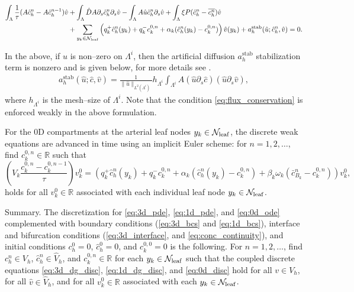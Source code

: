 \documentclass[fleqn,10pt]{wlscirep}
\begin{document}
\begin{align}\label{eq:1d_dg_disc}
\begin{split}
  \int_{\Lambda}  \frac{1}{\tau}(A  \hat c_h^n - A \hat c_h^{n-1}) \hat v  &+ \int_{\Lambda} \hat D A \partial_s \hat c_h^n  \partial_s \hat v - \int_{\Lambda} A \hat u \hat c_h^n \partial_s \hat v   +  \int_{\Lambda} \xi P (\hat c_h^n - \overline{c_h^n}) \hat v \\
&+ \sum_{y_k \in \mathcal{N}_{\rm leaf}} \left( q_k^+ \hat{c}_h^n(y_k) + q_k^- c_{k}^{0,n} + \alpha_k (\hat{c}_h^n(y_k) - c_{k}^{0,n}) \right) \hat{v}(y_k) + a_h^{\mathrm{stab}}(\hat u; \hat c_h^n, \hat v) = 0.  
\end{split}
\end{align}

 In the above, if $\hat u$ is non--zero on $\Lambda^i$, then the artificial diffusion $a_h^{\mathrm{stab}}$ stabilization term is nonzero  and is given below, for more details see \cite[Section 12.6]{quarteroni2009numerical}. 
 \begin{align}
    a_h^{\mathrm{stab}}(\hat u; \hat c, \hat v) =  \frac{1}{\|\hat u\|_{L^2(\Lambda^i)}} 
 h_{\Lambda^i} \int_{\Lambda^i} A (\hat u \partial_s \hat c  ) (\hat u \partial_s \hat v),  
 \end{align}
 where $h_{\Lambda^i}$ is the mesh--size of $\Lambda^i$.
Note that the condition \eqref{eq:flux_conservation} is enforced weakly in the above formulation.

For the 0D compartments at the arterial leaf nodes $y_k \in \mathcal{N}_{\rm leaf}$, the discrete weak equations are advanced in time using an implicit Euler scheme: for $n = 1, 2, \dots$, find $c_{k}^{0,n} \in \mathbb{R}$ such that
\begin{equation} \label{eq:0d_disc}
\left( V_k \frac{c_{k}^{0,n} - c_{k}^{0,n-1}}{\tau} \right) v_k^0 = \left( q_k^+ \hat{c}_h^n(y_k) + q_k^- c_{k}^{0,n} + \alpha_k (\hat{c}_h^n(y_k) - c_{k}^{0,n}) + \beta_k \omega_k ( \bar{c}_{B_k}^n - c_{k}^{0,n} ) \right) v_k^0,
\end{equation}
holds for all $v_k^0 \in \mathbb{R}$ associated with each individual leaf node $y_k \in \mathcal{N}_{\rm leaf}$.

Summary. The discretization for \eqref{eq:3d_pde}, \eqref{eq:1d_pde}, and \eqref{eq:0d_ode} complemented with boundary conditions (\eqref{eq:3d_bcs} and \eqref{eq:1d_bcs}), interface and bifurcation conditions (\eqref{eq:3d_interface}, and \eqref{eq:conc_continuity}), and initial conditions $c_h^0 = 0$, $\hat c_h^0 = 0$, and $c_{k}^{0,0} = 0$ is the following. For $n = 1,2, \ldots $, find $c_h^n \in V_h$, $\hat c^n_h \in \hat V_h$, and $c_{k}^{0,n} \in \mathbb{R}$ for each $y_k \in \mathcal{N}_{\rm leaf}$ such that the coupled discrete equations \eqref{eq:3d_dg_disc}, \eqref{eq:1d_dg_disc}, and \eqref{eq:0d_disc} hold for all $v \in V_h$, for all $\hat v \in \hat V_h$, and for all $v_k^0 \in \mathbb{R}$ associated with each $y_k \in \mathcal{N}_{\rm leaf}$.
\end{document}
